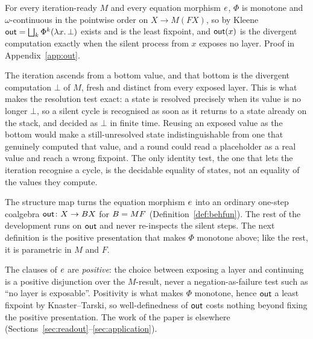\begin{proposition}\label{prop:outwd}
  For every iteration-ready $M$ and every equation morphism $e$, $\Phi$ is monotone and
  $\omega$-continuous in the pointwise order on $X \to M(F X)$, so by Kleene
  $\mathsf{out} = \bigsqcup_{k} \Phi^{k}(\lambda x.\,\bot)$ exists and is the least fixpoint, and $\mathsf{out}(x)$ is
  the divergent computation exactly when the silent process from $x$ exposes no layer. Proof in
  Appendix~\ref{app:out}.
\end{proposition}

\begin{remark}\label{rem:bottom}
  The iteration ascends from a bottom value, and that bottom is the divergent computation $\bot$ of $M$,
  fresh and distinct from every exposed layer. This is what makes the resolution test exact: a state is
  resolved precisely when its value is no longer $\bot$, so a silent cycle is recognised as soon as it
  returns to a state already on the stack, and decided as $\bot$ in finite time. Reusing an exposed
  value as the bottom would make a still-unresolved state indistinguishable from one that genuinely
  computed that value, and a round could read a placeholder as a real value and reach a wrong fixpoint.
  The only identity test, the one that lets the iteration recognise a cycle, is the decidable equality
  of states, not an equality of the values they compute.
\end{remark}

The structure map turns the equation morphism $e$ into an ordinary one-step coalgebra
$\mathsf{out} \colon X \to B X$ for $B = M F$ (Definition~\ref{def:behfun}). The rest of the
development runs on $\mathsf{out}$ and never re-inspects the silent steps. The next definition is the
positive presentation that makes $\Phi$ monotone above; like the rest, it is parametric in $M$ and
$F$.

\begin{remark}[Positivity]\label{rem:positivity}
  The clauses of $e$ are \emph{positive}: the choice between exposing a layer and continuing is a
  positive disjunction over the $M$-result, never a negation-as-failure test such as ``no layer is
  exposable''. Positivity is what makes $\Phi$ monotone, hence $\mathsf{out}$ a least fixpoint by
  Knaster--Tarski, so well-definedness of $\mathsf{out}$ costs nothing beyond fixing the positive presentation.
  The work of the paper is elsewhere (Sections~\ref{sec:readout}--\ref{sec:application}).
\end{remark}

